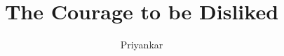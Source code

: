 \documentclass{notestyle}
\title{The Courage to be Disliked}
\author{Priyankar}
\begin{document}
\maketitle
\tableofcontents
\clearpage













\nocite{*}
\end{document}
